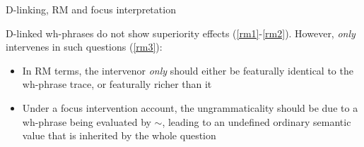 \documentclass[11pt,final,hyperref={pdfpagelabels=false}]{beamer}
\begin{document}
\begin{frame}{D-linking, RM and focus interpretation}

D-linked wh-phrases do not show superiority effects (\ref{rm1}-\ref{rm2}). However, \textit{only} intervenes in such questions (\ref{rm3}): 


\begin{exe}
\label{rm1}
\label{rm2}

\label{rm3}
\end{exe}

\begin{itemize}
\item In RM terms, the intervenor \textit{only} should either be featurally identical to the wh-phrase trace, or featurally richer than it
\item Under a focus intervention account, the ungrammaticality should be due to a wh-phrase being evaluated by $\sim$, leading to an undefined ordinary semantic value that is inherited by the whole question
\end{itemize}
\end{frame}
\end{document}

